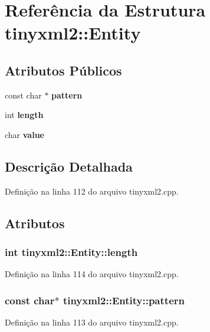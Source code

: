 \section{Referência da Estrutura tinyxml2\+:\+:Entity}
\label{structtinyxml2_1_1_entity}
\subsection*{Atributos Públicos}
\begin{DoxyCompactItemize}
\item 
const char $\ast$ {\bf pattern}
\item 
int {\bf length}
\item 
char {\bf value}
\end{DoxyCompactItemize}


\subsection{Descrição Detalhada}


Definição na linha 112 do arquivo tinyxml2.\+cpp.



\subsection{Atributos}
\subsubsection[{length}]{\setlength{\rightskip}{0pt plus 5cm}int tinyxml2\+::\+Entity\+::length}\label{structtinyxml2_1_1_entity_a25e2b57cb59cb4fa68f283d7cb570f21}


Definição na linha 114 do arquivo tinyxml2.\+cpp.

\subsubsection[{pattern}]{\setlength{\rightskip}{0pt plus 5cm}const char$\ast$ tinyxml2\+::\+Entity\+::pattern}\label{structtinyxml2_1_1_entity_ab330f5d665d29bfc811ecfa76315894b}


Definição na linha 113 do arquivo tinyxml2.\+cpp.

